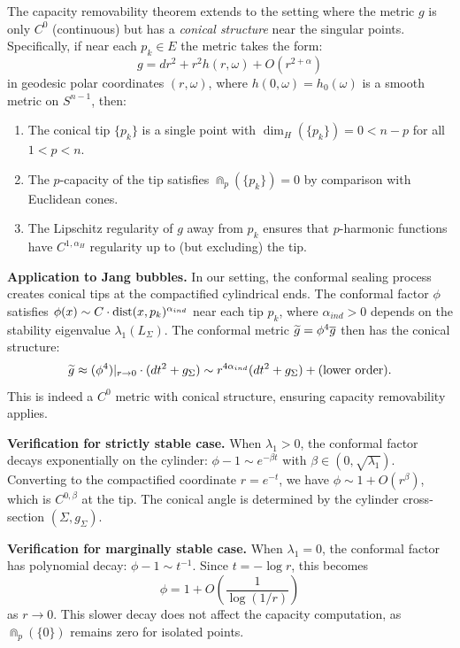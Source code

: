 \begin{remark}\label{rem:ConicalCapacity}
The capacity removability theorem extends to the setting where the metric $g$ is only $C^0$ (continuous) but has a \emph{conical structure} near the singular points. Specifically, if near each $p_k \in E$ the metric takes the form:
\begin{equation}
    g = dr^2 + r^2 h(r, \omega) + O(r^{2+\alpha})
\end{equation}
in geodesic polar coordinates $(r, \omega)$, where $h(0, \omega) = h_0(\omega)$ is a smooth metric on $S^{n-1}$, then:
\begin{enumerate}
    \item The conical tip $\{p_k\}$ is a single point with $\dim_H(\{p_k\}) = 0 < n - p$ for all $1 < p < n$.
    \item The $p$-capacity of the tip satisfies $\Cap_p(\{p_k\}) = 0$ by comparison with Euclidean cones.
    \item The Lipschitz regularity of $g$ away from $p_k$ ensures that $p$-harmonic functions have $C^{1,\alpha_H}$ regularity up to (but excluding) the tip.
\end{enumerate}

\textbf{Application to Jang bubbles.} In our setting, the conformal sealing process creates conical tips at the compactified cylindrical ends. The conformal factor $\phi$ satisfies $\phi(x) \sim C \cdot \mathrm{dist}(x, p_k)^{\alpha_{ind}}$ near each tip $p_k$, where $\alpha_{ind} > 0$ depends on the stability eigenvalue $\lambda_1(L_\Sigma)$. The conformal metric $\widetilde{g} = \phi^4 \overline{g}$ then has the conical structure:
\begin{equation}
    \widetilde{g} \approx (\phi^4)|_{r \to 0} \cdot (dt^2 + g_\Sigma) \sim r^{4\alpha_{ind}} (dt^2 + g_\Sigma) + \text{(lower order)}.
\end{equation}
This is indeed a $C^0$ metric with conical structure, ensuring capacity removability applies.

\textbf{Verification for strictly stable case.} When $\lambda_1 > 0$, the conformal factor decays exponentially on the cylinder: $\phi - 1 \sim e^{-\beta t}$ with $\beta \in (0, \sqrt{\lambda_1})$. Converting to the compactified coordinate $r = e^{-t}$, we have $\phi \sim 1 + O(r^\beta)$, which is $C^{0,\beta}$ at the tip. The conical angle is determined by the cylinder cross-section $(\Sigma, g_\Sigma)$.

\textbf{Verification for marginally stable case.} When $\lambda_1 = 0$, the conformal factor has polynomial decay: $\phi - 1 \sim t^{-1}$. Since $t = -\log r$, this becomes
\[
    \phi = 1 + O\!\left(\frac{1}{\log(1/r)}\right)
\]
as $r \to 0$. This slower decay does not affect the capacity computation, as $\Cap_p(\{0\})$ remains zero for isolated points.


\end{remark}
